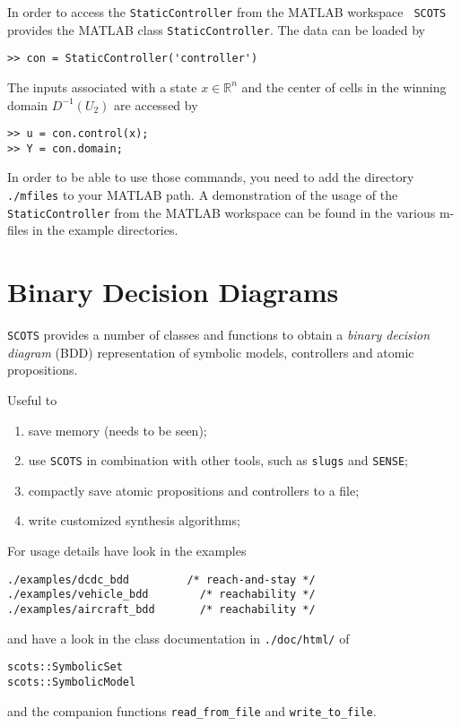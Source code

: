 \documentclass[a4paper]{amsart}
\newcommand{\R}{\mathbb{R}}
\begin{document}
In order to access the {\tt StaticController} from the MATLAB workspace {\tt
SCOTS} provides the MATLAB class {\tt StaticController}. The data can be loaded
by
\begin{lstlisting}[basicstyle=\small\ttfamily]
>> con = StaticController('controller')
\end{lstlisting}
The inputs associated with a state $x\in \R^n$ and the center of cells in the
winning domain $D^{-1}(U_2)$ are accessed by
\begin{lstlisting}[basicstyle=\small\ttfamily]
>> u = con.control(x);
>> Y = con.domain;
\end{lstlisting}
In order to be able to use those commands, you need to add the directory {\tt
./mfiles} to your MATLAB path.
A demonstration of the usage of the {\tt StaticController} from the MATLAB
workspace can be found in the various m-files in the example directories.


\section{Binary Decision Diagrams}

{\tt SCOTS} provides a number of classes and functions to obtain a \emph{binary decision
diagram} (BDD) representation of symbolic models, controllers and atomic
propositions. 


Useful to 
\begin{enumerate}
  \item save memory (needs to be seen);
  \item use {\tt SCOTS} in combination with other tools, such as {\tt slugs} and {\tt SENSE};
  \item compactly save atomic propositions and controllers to a file;
  \item write customized synthesis algorithms;
\end{enumerate}
For usage details have look in the examples
\begin{lstlisting}[basicstyle=\small\ttfamily]
./examples/dcdc_bdd        	/* reach-and-stay */ 
./examples/vehicle_bdd  	  /* reachability */ 
./examples/aircraft_bdd  	  /* reachability */ 
\end{lstlisting}
and have a look in the class documentation in {\tt ./doc/html/} of
\begin{lstlisting}[basicstyle=\small\ttfamily]
scots::SymbolicSet
scots::SymbolicModel
\end{lstlisting}
and the companion functions
{\tt read\_from\_file} and {\tt write\_to\_file}.

%
%




\newpage

\printbibliography
\end{document}
